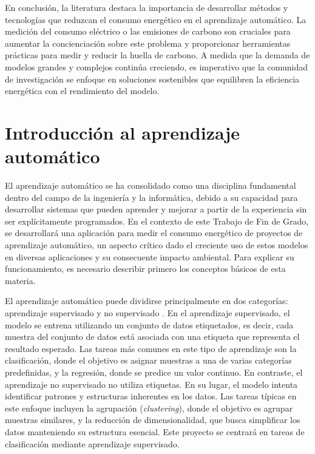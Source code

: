 En conclusión, la literatura destaca la importancia de desarrollar métodos y tecnologías que reduzcan el consumo energético en el aprendizaje automático. La medición del consumo eléctrico o las emisiones de carbono son cruciales para aumentar la concienciación sobre este problema y proporcionar herramientas prácticas para medir y reducir la huella de carbono. A medida que la demanda de modelos grandes y complejos continúa creciendo, es imperativo que la comunidad de investigación se enfoque en soluciones sostenibles que equilibren la eficiencia energética con el rendimiento del modelo.

\section{Introducción al aprendizaje automático}
\label{sec:intro-ml}

El aprendizaje automático se ha consolidado como una disciplina fundamental dentro del campo de la ingeniería y la informática, debido a su capacidad para desarrollar sistemas que pueden aprender y mejorar a partir de la experiencia sin ser explícitamente programados. En el contexto de este Trabajo de Fin de Grado, se desarrollará una aplicación para medir el consumo energético de proyectos de aprendizaje automático, un aspecto crítico dado el creciente uso de estos modelos en diversas aplicaciones y su consecuente impacto ambiental. Para explicar su funcionamiento, es necesario describir primero los conceptos básicos de esta materia.

El aprendizaje automático puede dividirse principalmente en dos categorías: aprendizaje supervisado y no supervisado \cite{kelleher2020fundamentals}. En el aprendizaje supervisado, el modelo se entrena utilizando un conjunto de datos etiquetados, es decir, cada muestra del conjunto de datos está asociada con una etiqueta que representa el resultado esperado. Las tareas más comunes en este tipo de aprendizaje son la clasificación, donde el objetivo es asignar muestras a una de varias categorías predefinidas, y la regresión, donde se predice un valor continuo. 
En contraste, el aprendizaje no supervisado no utiliza etiquetas. En su lugar, el modelo intenta identificar patrones y estructuras inherentes en los datos. Las tareas típicas en este enfoque incluyen la agrupación (\textit{clustering}), donde el objetivo es agrupar muestras similares, y la reducción de dimensionalidad, que busca simplificar los datos manteniendo su estructura esencial. Este proyecto se centrará en tareas de clasificación mediante aprendizaje supervisado.

